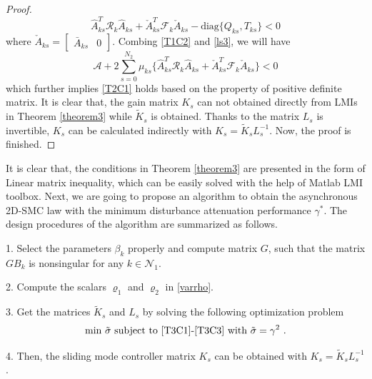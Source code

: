 \documentclass[conference]{IEEEtran}
\begin{document}
\begin{proof}
	 \begin{equation} \label{ls3}
	 	\hat{A}^{T}_{ks}\mathcal{R}_{k}\hat{A}_{ks} + \check{A}^{T}_{ks}\mathcal{F}_{k}\check{A}_{ks}  - \mathrm{diag}\{Q_{ks}, T_{ks}\} < 0  
	 \end{equation}
	 where $\check{A}_{ks}=\begin{bmatrix}
	 \bar{A}_{ks}&0
	 \end{bmatrix}$. Combing \eqref{T1C2} and \eqref{ls3},  we will have
	 \begin{equation}
	 	\mathcal{A} +2\sum_{s=0}^{N_{2}}\mu_{ks}\Big\{ \hat{A}^{T}_{ks}\mathcal{R}_{k}\hat{A}_{ks} + \check{A}^{T}_{ks}\mathcal{F}_{k}\check{A}_{ks} \Big\} < 0
	 \end{equation}
	 which further implies \eqref{T2C1} holds based on the property of positive definite matrix. It is clear that, the gain matrix $K_{s}$ can not obtained directly from LMIs in Theorem \ref{theorem3} while $\tilde{K}_{s}$ is obtained. Thanks to the matrix $L_{s}$ is invertible, $K_{s}$ can be calculated indirectly with $K_{s}=\tilde{K}_{s}L^{-1}_{s}$. Now, the proof is finished.
\end{proof}
	It is clear that, the conditions in Theorem \ref{theorem3} are presented in the form of Linear matrix inequality, which can be easily solved with the help of Matlab LMI toolbox. Next, we are going to propose an algorithm to obtain the asynchronous 2D-SMC law with the minimum disturbance attenuation performance $\gamma^{*}$. The design procedures of the algorithm are summarized as follows.
	
	1. Select the parameters $\beta_{k}$ properly and compute matrix $G$, such that the matrix $GB_{k}$ is nonsingular for any $k\in\mathcal{N}_{1}$. 
	
	2. Compute the scalars $\varrho_{1}$ and $\varrho_{2}$ in \eqref{varrho}. 

	3. Get the matrices  $\tilde{K}_{s}$ and $L_{s}$ by solving the  following optimization problem
	\begin{equation}\label{optimization-problem}
		\text{min $\tilde{\sigma}$ subject to \eqref{T3C1}-\eqref{T3C3} with $\tilde\sigma=\gamma^{2}$ }.
	\end{equation}
	
	4. Then, the sliding mode controller matrix $K_s$ can be obtained with $K_{s}= \tilde{K}_{s}L^{-1}_{s}$.
\end{document}
